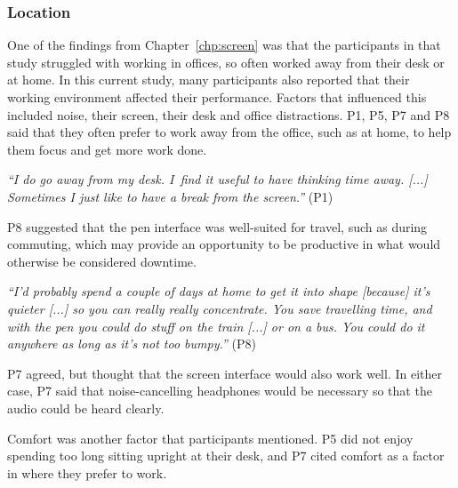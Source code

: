 

\subsubsection{Location}

One of the findings from Chapter~\ref{chp:screen} was that the participants in that study struggled with working in
offices, so often worked away from their desk or at home. In this current study, many participants also reported that
their working environment affected their performance. Factors that influenced this included noise, their screen, their
desk and office distractions. P1, P5, P7 and P8 said that they often prefer to work away from the office, such as at
home, to help them focus and get more work done.

\textit{``I do go away from my desk. I find it useful to have thinking time away. [...] Sometimes I just like to have a
break from the screen.''} (P1)

P8 suggested that the pen interface was well-suited for travel, such as during commuting, which may provide an
opportunity to be productive in what would otherwise be considered downtime.

\textit{``I'd probably spend a couple of days at home to get it into shape [because] it's quieter [...]
  so you can really really concentrate. You save travelling time, and with the pen you could do stuff on the train [...]
  or on a bus. You could do it anywhere as long as it's not too bumpy.''} (P8)

P7 agreed, but thought that the screen interface would also work well. In either case, P7 said that noise-cancelling
headphones would be necessary so that the audio could be heard clearly.

Comfort was another factor that participants mentioned. P5 did not enjoy spending too long sitting upright at their
desk, and P7 cited comfort as a factor in where they prefer to work.

